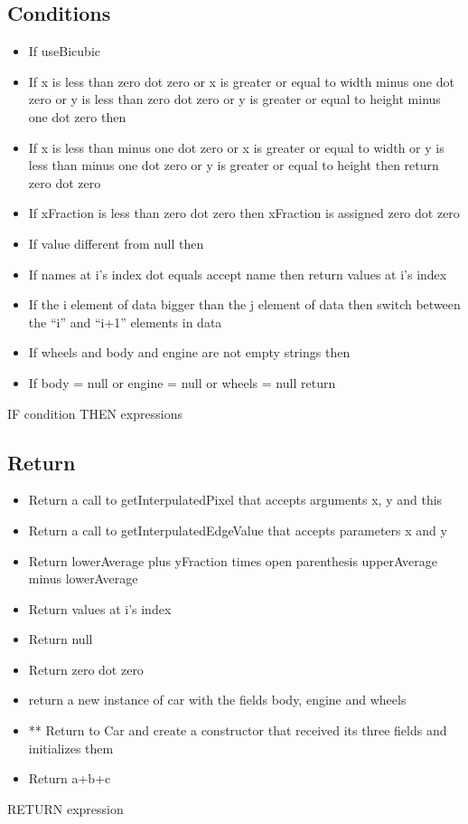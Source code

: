 \subsection{Conditions}
\begin{itemize}
	\item If useBicubic
	\item If x is less than zero dot zero or x is greater or equal to width minus one dot zero or y is less than zero dot zero or y is greater or equal to height minus one dot zero then
	\item If x is less than minus one dot zero or x is greater or equal to width or y is less than minus one dot zero or y is greater or equal to height then return zero dot zero
	\item If xFraction is less than zero dot zero then xFraction is assigned zero dot zero
	\item If value different from null then
	\item If names at i’s index dot equals accept name then return values at i’s index
	\item If the i element of data bigger than the j element of data then switch between the “i” and “i+1” elements in data
	\item If  wheels and body and engine are not empty strings then
	\item If body = null or engine = null or wheels = null return
\end{itemize}
IF condition THEN expressions
\subsection{Return}
\begin{itemize}
	\item Return a call to getInterpulatedPixel that accepts arguments x, y and this
	\item Return a call to getInterpulatedEdgeValue that accepts parameters x and y
	\item Return lowerAverage plus yFraction times open parenthesis upperAverage minus lowerAverage
	\item Return values at i’s index
	\item Return null
	\item Return zero dot zero
	\item return a new instance of car with the fields body, engine and wheels
	\item ** Return to Car and create a constructor that received its three fields and initializes them
	\item Return a+b+c
\end{itemize}
RETURN expression
